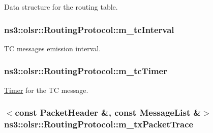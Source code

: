 Data structure for the routing table. 

\subsubsection[{\texorpdfstring{m\+\_\+tc\+Interval}{m_tcInterval}}]{ ns3\+::olsr\+::\+Routing\+Protocol\+::m\+\_\+tc\+Interval\hspace{0.3cm}{\ttfamily [private]}}\hypertarget{classns3_1_1olsr_1_1RoutingProtocol_ae282dcb4112be0b4f2ac8f413b022fa9}{}\label{classns3_1_1olsr_1_1RoutingProtocol_ae282dcb4112be0b4f2ac8f413b022fa9}


TC messages\textquotesingle{} emission interval. 

\subsubsection[{\texorpdfstring{m\+\_\+tc\+Timer}{m_tcTimer}}]{ ns3\+::olsr\+::\+Routing\+Protocol\+::m\+\_\+tc\+Timer\hspace{0.3cm}{\ttfamily [private]}}\hypertarget{classns3_1_1olsr_1_1RoutingProtocol_a31e8b4356d659f7ec1c82b86365a179d}{}\label{classns3_1_1olsr_1_1RoutingProtocol_a31e8b4356d659f7ec1c82b86365a179d}


\hyperlink{classns3_1_1Timer}{Timer} for the TC message. 

\subsubsection[{\texorpdfstring{m\+\_\+tx\+Packet\+Trace}{m_txPacketTrace}}]{$<$const {\bf Packet\+Header} \&, const {\bf Message\+List} \&$>$ ns3\+::olsr\+::\+Routing\+Protocol\+::m\+\_\+tx\+Packet\+Trace\hspace{0.3cm}{\ttfamily [private]}}\hypertarget{classns3_1_1olsr_1_1RoutingProtocol_aadd8d4fea9a32b185bf23d787004de9d}{}\label{classns3_1_1olsr_1_1RoutingProtocol_aadd8d4fea9a32b185bf23d787004de9d}


